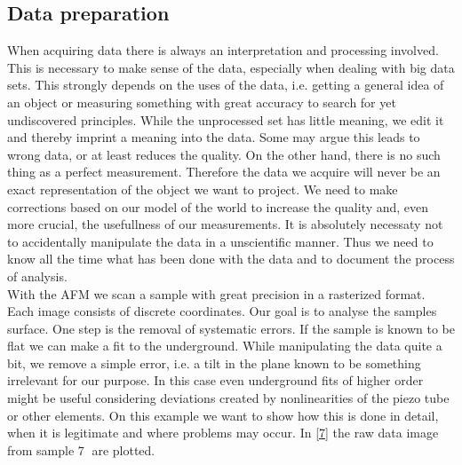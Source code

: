 \documentclass[paper=a4,fontsize=10pt,DIV=18,twocolumn,parskip=half]{scrartcl}
\numberwithin{equation}{section}    %
\begin{document}
\subsection{Data preparation}
When acquiring data there is always an interpretation and processing involved.  
This is necessary to make sense of the data, especially when dealing with big 
data sets. This strongly depends on the uses of the data, i.e. getting a general 
idea of an object or measuring something with great accuracy to search for yet 
undiscovered principles. While the unprocessed set has little meaning, we edit 
it and thereby imprint a meaning into the data. Some may argue this leads to 
wrong data, or at least reduces the quality. On the other hand, there is no such 
thing as a perfect measurement.  Therefore the data we acquire will never be an 
exact representation of the object we want to project. We need to make 
corrections based on our model of the world to increase the quality and, even 
more crucial, the usefullness of our measurements.  It is absolutely necessaty 
not to accidentally manipulate the data in a unscientific manner. Thus we need 
to know all the time what has been done with the data and to document the 
process of analysis. \\
With the AFM we scan a sample with great precision in a rasterized format. Each 
image consists of discrete coordinates. Our goal is to analyse the samples 
surface. One step is the removal of systematic errors. If the sample is known to 
be flat we can make a fit to the underground. While manipulating the data quite 
a bit, we remove a simple error, i.e. a tilt in the plane known to be something 
irrelevant for our purpose. In this case even underground fits of higher order 
might be useful considering deviations created by nonlinearities of the piezo 
tube or other elements. On this example we want to show how this is done in 
detail, when it is legitimate and where problems may occur. In \ref{7} the 
raw data image from sample \textcircled{7} are plotted.
\end{document}
